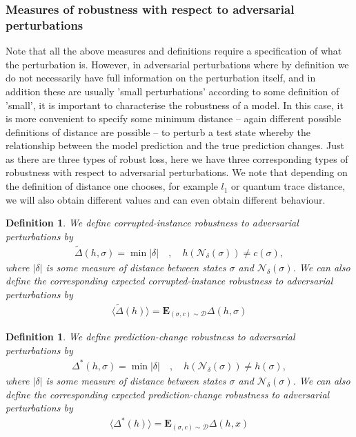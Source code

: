 \documentclass[onecolumn,prx, superscriptaddress,longbibliography,margin=1mm 11pt]{revtex4-2}
\newtheorem{definition}[theorem]{Definition}
\begin{document}
\subsubsection{Measures of robustness with respect to adversarial perturbations}
Note that all the above measures and definitions require a specification of what the perturbation is. However, in adversarial perturbations where by definition we do not necessarily have full information on the perturbation itself, and in addition these are usually 'small perturbations' according to some definition of 'small', it is important to characterise the robustness of a model. In this case, it is more convenient to specify some minimum distance -- again different possible definitions of distance are possible -- to perturb a test state whereby the relationship between the model prediction and the true prediction changes. Just as there are three types of robust loss, here we have three corresponding types of robustness with respect to adversarial perturbations. We note that depending on the definition of distance one chooses, for example $l_1$ or quantum trace distance, we will also obtain different values and can even obtain different behaviour. 
\begin{definition}
    We define \textit{corrupted-instance robustness to adversarial perturbations} by 
\begin{align}
   \tilde{\Delta}(h,\sigma)=\min {|\delta|} \quad, \quad h(\mathcal{N}_{\delta}(\sigma))\neq c(\sigma),
\end{align}
where $|\delta|$ is some measure of distance between states $\sigma$ and $\mathcal{N}_{\delta}(\sigma)$. 
We can also define the corresponding \textit{expected corrupted-instance robustness to adversarial perturbations} by
\begin{align}
   \langle  \tilde{\Delta}(h) \rangle=\textbf{E}_{{(\sigma, c) \sim \mathcal{D}}} \Delta(h,\sigma) 
\end{align}
\end{definition}
\begin{definition}
 We define \textit{prediction-change robustness to adversarial perturbations} by 
\begin{align}
    \Delta^*(h,\sigma)=\min {|\delta|} \quad, \quad h(\mathcal{N}_{\delta}(\sigma))\neq h(\sigma),
\end{align}
where $|\delta|$ is some measure of distance between states $\sigma$ and $\mathcal{N}_{\delta}(\sigma)$.
We can also define the corresponding \textit{expected prediction-change robustness to adversarial perturbations} by
\begin{align}
    \langle \Delta^*(h)\rangle =\textbf{E}_{{(\sigma, c) \sim \mathcal{D}}} \Delta(h,x) 
\end{align}
\end{definition}
\end{document}
